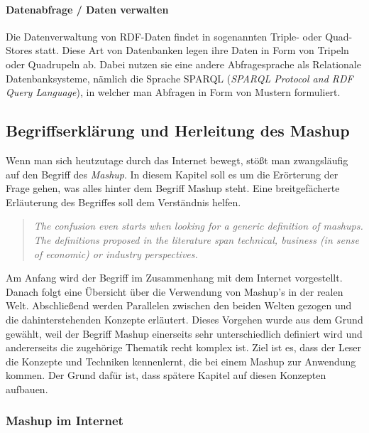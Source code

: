 \documentclass[11pt]{article}
\begin{document}
\paragraph{Datenabfrage / Daten verwalten} 

Die Datenverwaltung von RDF-Daten findet in sogenannten Triple- oder Quad-Stores statt. Diese Art von Datenbanken legen ihre Daten in Form von Tripeln oder Quadrupeln ab. Dabei nutzen sie eine andere Abfragesprache als Relationale Datenbanksysteme, nämlich die Sprache SPARQL (\textit{SPARQL Protocol and RDF Query Language})\cite{SPARQL-SPEC}, in welcher man Abfragen in Form von Mustern formuliert.

%
%
\newpage
\subsection{Begriffserklärung und Herleitung des Mashup}
\label{sec:chapterBasicsMashup}

Wenn man sich heutzutage durch das Internet bewegt, stößt man zwangsläufig auf den Begriff des \emph{Mashup}. In diesem Kapitel soll es um die Erörterung der Frage gehen, was alles hinter dem Begriff Mashup steht. Eine breitgefächerte Erläuterung des Begriffes soll dem Verständnis helfen.

%
%
\begin{quote}
    \emph{The confusion even starts when looking for a generic definition of mashups. The definitions proposed in the literature span technical, business (in sense of economic) or industry perspectives.} \\ \cite[S. 1]{MASHUP-ELUCID}
\end{quote}

\noindent
Am Anfang wird der Begriff im Zusammenhang mit dem Internet vorgestellt. Danach folgt eine Übersicht über die Verwendung von Mashup's in der realen Welt. Abschließend werden Parallelen zwischen den beiden Welten gezogen und die dahinterstehenden Konzepte erläutert. Dieses Vorgehen wurde aus dem Grund gewählt, weil der Begriff Mashup einerseits sehr unterschiedlich definiert wird und andererseits die zugehörige Thematik recht komplex ist. Ziel ist es, dass der Leser die Konzepte und Techniken kennenlernt, die bei einem Mashup zur Anwendung kommen. Der Grund dafür ist, dass spätere Kapitel auf diesen Konzepten aufbauen.


%
%
\subsubsection{Mashup im Internet}
\end{document}
